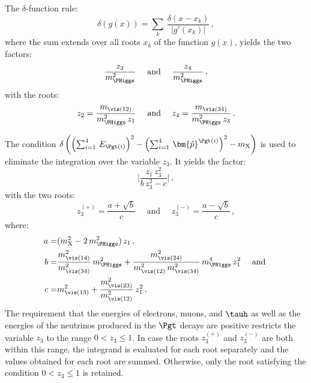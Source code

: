 The $\delta$-function rule:
\begin{equation*} 
\delta \left( g(x) \right) = \sum_{k} \, \frac{\delta \left( x - x_{k}
  \right)}{\vert g'(x_{k}) \vert} \, ,
\end{equation*}
where the sum extends over all roots $x_{k}$ of the function $g(x)$,
yields the two factors:
\begin{equation*}
\frac{z_{2}}{m_{\PHiggs}^{2}} \quad \mbox{ and } \quad \frac{z_{4}}{m_{\PHiggs}^{2}} \, ,
\end{equation*}
with the roots:
\begin{equation*}
z_{2} = \frac{m_{\vis(12)}}{m_{\PHiggs}^{2} \, z_{1}} \quad \mbox{ and } \quad z_{4} = \frac{m_{\vis(34)}}{m_{\PHiggs}^{2} \, z_{3}} \, .
\end{equation*}

The condition
$\delta\left( \left(\sum_{i=1}^{4} \, E_{\Pgt(i)}\right)^{2} - \left(\sum_{i=1}^{4} \, \bm{\hat{p}}^{\Pgt(i)}\right)^{2} - m_{\textrm{X}} \right)$
is used to eliminate the integration over the variable $z_{3}$.
It yields the factor:
\begin{equation}
\lvert \frac{z_{1} \, z_{3}^{2}}{b \, z_{3}^{2} - c} \rvert \, ,
\label{eq:deltaFuncFactor}
\end{equation}
with the two roots:
\begin{equation*}
z_{3}^{(+)} = \frac{a + \sqrt{b}}{c} \quad \mbox{ and } \quad z_{3}^{(-)} = \frac{a - \sqrt{b}}{c} \, ,
\end{equation*}
where:
\begin{align}
a = & (m_{\textrm{X}}^{2} - 2 \, m_{\PHiggs}^{2}) \, z_{1} \, , \nonumber \\
b = & \frac{m_{\vis(14)}^{2}}{m_{\vis(34)}^{2}} \, m_{\PHiggs}^{2} + \frac{m_{\vis(24)}^{2}}{m_{\vis(12)}^{2} \, m_{\vis(34)}^{2}} \, m_{\PHiggs}^{4} \, z_{1}^{2} \quad \mbox{ and } \nonumber \\
c = & m_{\vis(13)}^{2} + \frac{m_{\vis(23)}^{2}}{m_{\vis(12)}^{2}} \, z_{1}^{2} \, .
\end{align}
The requirement that the energies of electrons, muons, and $\tauh$ 
as well as the energies of the neutrinos produced in the $\Pgt$ decays are positive
restricts the variable $z_{3}$ to the range $0 < z_{3} \leq 1$.
In case the roots $z_{3}^{(+)}$ and $z_{3}^{(-)}$ are both within this range,
the integrand is evaluated for each root separately and the values obtained for each root are summed.
Otherwise, only the root satisfying the condition $0 < z_{3} \leq 1$ is retained.

